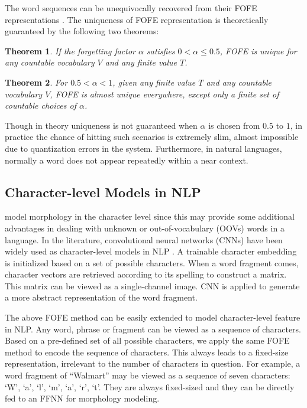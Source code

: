 \documentclass[11pt,a4paper]{article}
\newtheorem{theorem}{Theorem}
\begin{document}
The word sequences can be unequivocally recovered from their FOFE representations \cite{zhang2015fixed}.
The uniqueness of FOFE representation is theoretically guaranteed
by the following two theorems: 
\begin{theorem}
	If the forgetting factor $\alpha$ satisfies $0 < \alpha \leq 0.5$, FOFE is unique for any countable vocabulary $V$ and any finite value $T$.
\end{theorem}
\begin{theorem}
	For $0.5 < \alpha < 1 $, given any finite value $T$ and any countable vocabulary $V$,
	FOFE is almost unique everywhere, except only a finite set of countable choices of $\alpha$.
\end{theorem}
Though in theory uniqueness is not guaranteed when $\alpha$ is chosen from $0.5$ to $1$, 
in practice the chance of hitting such scenarios is extremely slim, almost impossible due to quantization errors in the system. 
Furthermore, in natural languages, normally a word does not appear repeatedly within a near context. 


\subsection {Character-level Models in NLP}
\label{subsec_char_feature}

 model morphology in the character level since this may provide some additional advantages in dealing with unknown or out-of-vocabulary (OOVs) words in a language. In the literature, convolutional neural networks (CNNs) have been widely used as character-level models in NLP \cite{kim2015character}. 
A trainable character embedding is initialized based on a set of possible characters. When a word fragment comes, character vectors are retrieved according to its spelling to construct a matrix. This matrix can be viewed as a single-channel image. CNN is applied to generate a more abstract representation of the word fragment.

The above FOFE method can be easily extended to model character-level feature in NLP. Any word, phrase or fragment can be viewed as a sequence of characters. Based on a pre-defined set of all possible characters, we apply the same FOFE method to encode the sequence of characters. This always leads to a fixed-size representation, irrelevant to the number of characters in question. 
For example, a word fragment of ``Walmart'' may be viewed as a 
sequence of seven characters: `W', `a', `l', `m', `a', `r', `t'.
They are
always fixed-sized and they can be directly fed to an FFNN for morphology modeling. 
\end{document}
